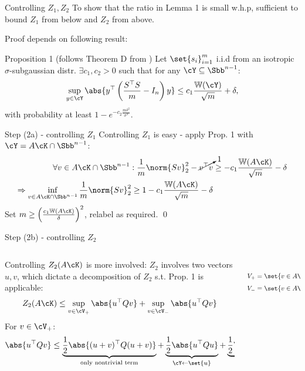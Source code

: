 \documentclass[10pt]{beamer}
\begin{document}
\begin{frame}{Controlling $Z_1, Z_2$}
    To show that the ratio in Lemma 1 is small w.h.p, sufficient to bound $Z_1$
    from below and $Z_2$ from above.

    Proof depends on following result:
    \begin{block}{Proposition 1 (follows Theorem D from \cite{MenPajTom07})}
        Let $\set{s_i}_{i=1}^m$ i.i.d from an isotropic $\sigma$-subgaussian
        distr. $\exists c_1, c_2 > 0$ such that for any
        $ \cY \subseteq \Sbb^{n - 1} $:
        \[
            \sup_{y \in \cY} \abs{
                y^\top \left( \frac{S^\top S}{m} - I_n \right) y
            } \leq c_1 \frac{\mathbb{W}(\cY)}{\sqrt{m}} + \delta,
        \]
        with probability at least $1 - e^{-c_2 \frac{m \delta^2}{\sigma^4}}$.
    \end{block}
\end{frame}

\begin{frame}{Step (2a) - controlling $Z_1$ }
    Controlling $Z_1$ is easy - apply Prop. 1 with $\cY = A\cK \cap \Sbb^{n-1}$:
    \begin{align*}
        \forall v \in A \cK \cap \Sbb^{n-1}:
        \frac{1}{m} \norm{Sv}^2_2 - \cancelto{1}{v^\top v}
        & \geq - c_1 \frac{\mathbb{W}(A \cK)}{\sqrt{m}} - \delta \\
        \Rightarrow
        \inf_{v \in A\cK \cap \Sbb^{n-1}} \frac{1}{m} \norm{Sv}_2^2 \geq 1 -
        c_1 \frac{\mathbb{W}(A
        \cK)}{\sqrt{m}} - \delta
    \end{align*}
    Set $m \geq \left( \frac{c_1 \mathbb{W}(A \cK)}{\delta} \right)^2$, relabel
    as required. \qed
\end{frame}

\begin{frame}{Step (2b) - controlling $Z_2$}
\begin{columns}
    \begin{column}{0.75 \textwidth}
    Controlling $Z_2(A \cK)$ is more involved: $Z_2$ involves two vectors $u,
    v$, which dictate a decomposition of $Z_2$ s.t. Prop. 1 is applicable:
    \[
        Z_2(A \cK) \leq \sup_{v \in \cV_+} \abs{u^\top Q v} +
        \sup_{v \in \cV_-} \abs{u^\top Q v}
    \]
    For $v \in \cV_+$:
    \[
        \abs{u^\top Q v} \leq
        \underbrace{\frac{1}{2} \abs{(u + v)^\top Q (u + v)}}_{
            \text{only nontrivial term}}
        + \underbrace{\frac{1}{2} \abs{u^\top Q u}}_{\cY \gets \set{u}} +
        \underbrace{\frac{1}{2} \abs{v^\top Q v}}_{\cY \gets \cV_+}
    \]
    \end{column}
    \vrule{}
    \begin{column}{0.24 \textwidth}
        \begin{align*}
            \scalebox{0.8}{$Q := \frac{S^\top S}{m} - I_n$} \\
            \scalebox{0.8}{$V_+ = \set{v \in A \cK : \ip{u, v} \geq 0}$} \\
            \scalebox{0.8}{$V_- = \set{v \in A \cK : \ip{u, v} < 0}$}
        \end{align*}
    \end{column}
\end{columns}
\end{frame}
\end{document}

